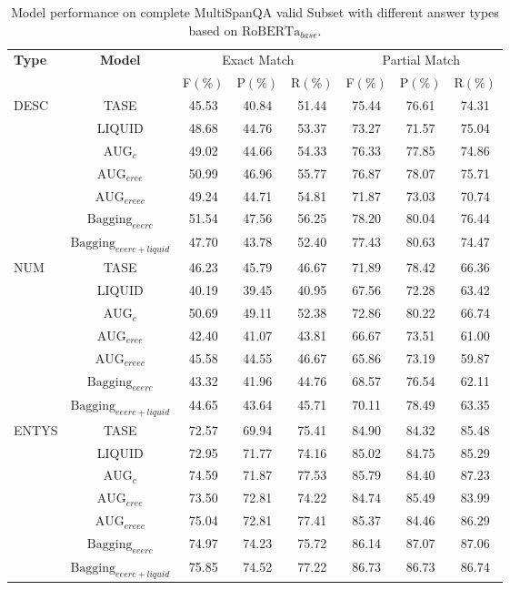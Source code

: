 \begin{table*}[ht]
	\caption{Model performance on complete MultiSpanQA valid Subset with different answer types based on $\text{RoBERTa}_{base}$.}
	\label{tab:robertasub}
	\begin{tabular*}{\textwidth}{@{\extracolsep{\fill}}lccccccc}
		\toprule
		\multirow{2}{*}{\textbf{Type}} & \multirow{2}{*}{\textbf{Model}} & \multicolumn{3}{c}{Exact Match} & \multicolumn{3}{c}{Partial Match} \\
		\cmidrule{3-8} 
		& & F\((\%)\) & P\((\%)\) & R\((\%)\) & F\((\%)\) & P\((\%)\) & R\((\%)\) \\
		\midrule
		\multirow{6}{*}{DESC} & TASE & 45.53 & 40.84 & 51.44 & 75.44 & 76.61 & 74.31 \\ 
		& LIQUID & 48.68 & 44.76 & 53.37 & 73.27 & 71.57 & 75.04 \\
		& $\text{AUG}_{c}$ & 49.02 & 44.66 & 54.33 & 76.33 & 77.85 & 74.86 \\
		& $\text{AUG}_{eree}$ & 50.99 & 46.96 & 55.77 & 76.87 & 78.07 & 75.71 \\
		& $\text{AUG}_{ereec}$ & 49.24 & 44.71 & 54.81 & 71.87 & 73.03 & 70.74 \\
		& $\text{Bagging}_{eeerc}$ & 51.54 & 47.56 & 56.25 & 78.20 & 80.04 & 76.44 \\
		& $\text{Bagging}_{eeerc+liquid}$ & 47.70 & 43.78 & 52.40 & 77.43 & 80.63 & 74.47 \\
		\midrule
		\multirow{6}{*}{NUM} & TASE & 46.23 & 45.79 & 46.67 & 71.89 & 78.42 & 66.36 \\ 
		& LIQUID & 40.19 & 39.45 & 40.95 & 67.56 & 72.28 & 63.42 \\
		& $\text{AUG}_{c}$ & 50.69 & 49.11 & 52.38 & 72.86 & 80.22 & 66.74 \\
		& $\text{AUG}_{eree}$ & 42.40 & 41.07 & 43.81 & 66.67 & 73.51 & 61.00 \\
		& $\text{AUG}_{ereec}$ & 45.58 & 44.55 & 46.67 & 65.86 & 73.19 & 59.87 \\
		& $\text{Bagging}_{eeerc}$ & 43.32 & 41.96 & 44.76 & 68.57 & 76.54 & 62.11 \\
		& $\text{Bagging}_{eeerc+liquid}$ & 44.65 & 43.64 & 45.71 & 70.11 & 78.49 & 63.35 \\
		\midrule
		\multirow{6}{*}{ENTYS} & TASE & 72.57 & 69.94 & 75.41 & 84.90 & 84.32 & 85.48 \\ 
		& LIQUID & 72.95 & 71.77 & 74.16 & 85.02 & 84.75 & 85.29 \\
		& $\text{AUG}_{c}$ & 74.59 & 71.87 & 77.53 & 85.79 & 84.40 & 87.23 \\
		& $\text{AUG}_{eree}$ & 73.50 & 72.81 & 74.22 & 84.74 & 85.49 & 83.99 \\
		& $\text{AUG}_{ereec}$ & 75.04 & 72.81 & 77.41 & 85.37 & 84.46 & 86.29 \\
		& $\text{Bagging}_{eeerc}$ & 74.97 & 74.23 & 75.72 & 86.14 & 87.07 & 87.06 \\
		&$\text{Bagging}_{eeerc+liquid}$ & 75.85 & 74.52 & 77.22 & 86.73 & 86.73 & 86.74 \\
		\bottomrule
	\end{tabular*}
\end{table*}


